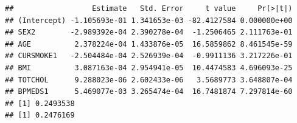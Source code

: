 \documentclass[10pt,ignorenonframetext,]{beamer}
\newenvironment{Shaded}{\begin{snugshade}}{\end{snugshade}}
\newcommand{\KeywordTok}[1]{\textcolor[rgb]{0.13,0.29,0.53}{\textbf{#1}}}
\newcommand{\DataTypeTok}[1]{\textcolor[rgb]{0.13,0.29,0.53}{#1}}
\newcommand{\DecValTok}[1]{\textcolor[rgb]{0.00,0.00,0.81}{#1}}
\newcommand{\StringTok}[1]{\textcolor[rgb]{0.31,0.60,0.02}{#1}}
\newcommand{\OperatorTok}[1]{\textcolor[rgb]{0.81,0.36,0.00}{\textbf{#1}}}
\newcommand{\NormalTok}[1]{#1}
\begin{document}
\begin{frame}[fragile]

\scriptsize

\begin{Shaded}
\end{Shaded}

\begin{verbatim}
##                  Estimate   Std. Error     t value     Pr(>|t|)
## (Intercept) -1.105693e-01 1.341653e-03 -82.4127584 0.000000e+00
## SEX2        -2.989392e-04 2.390278e-04  -1.2506465 2.111763e-01
## AGE          2.378224e-04 1.433876e-05  16.5859862 8.461545e-59
## CURSMOKE1   -2.504484e-04 2.526939e-04  -0.9911136 3.217226e-01
## BMI          3.087163e-04 2.954941e-05  10.4474583 4.696093e-25
## TOTCHOL      9.288023e-06 2.602433e-06   3.5689773 3.648807e-04
## BPMEDS1      5.469077e-03 3.265474e-04  16.7481874 7.297814e-60
## [1] 0.2493538
## [1] 0.2476169
\end{verbatim}

\end{frame}
\end{document}
